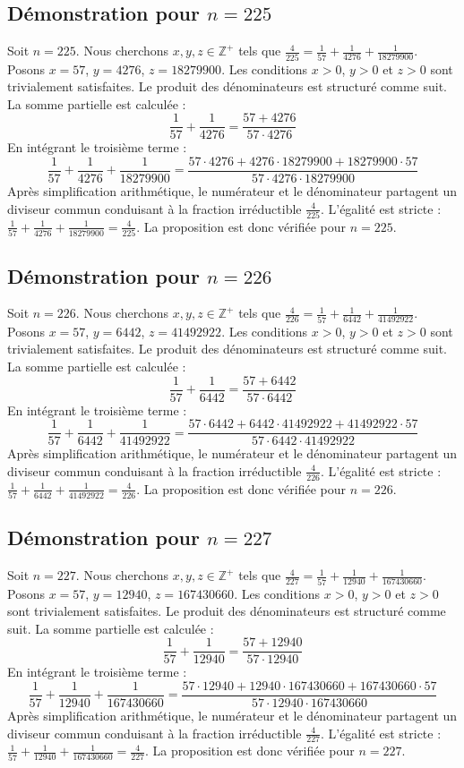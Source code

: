 \documentclass[11pt,a4paper]{article}
\begin{document}
\subsection{Démonstration pour $n = 225$}
Soit $n = 225$. Nous cherchons $x, y, z \in \mathbb{Z}^{+}$ tels que $\frac{4}{225} = \frac{1}{57} + \frac{1}{4276} + \frac{1}{18279900}$.
Posons $x = 57$, $y = 4276$, $z = 18279900$.
Les conditions $x > 0$, $y > 0$ et $z > 0$ sont trivialement satisfaites.
Le produit des dénominateurs est structuré comme suit. La somme partielle est calculée :
$$ \frac{1}{57} + \frac{1}{4276} = \frac{57+4276}{57 \cdot 4276} $$
En intégrant le troisième terme :
$$ \frac{1}{57} + \frac{1}{4276} + \frac{1}{18279900} = \frac{57 \cdot 4276 + 4276 \cdot 18279900 + 18279900 \cdot 57}{57 \cdot 4276 \cdot 18279900} $$
Après simplification arithmétique, le numérateur et le dénominateur partagent un diviseur commun conduisant à la fraction irréductible $\frac{4}{225}$.
L'égalité est stricte : $\frac{1}{57} + \frac{1}{4276} + \frac{1}{18279900} = \frac{4}{225}$.
La proposition est donc vérifiée pour $n = 225$.
\subsection{Démonstration pour $n = 226$}
Soit $n = 226$. Nous cherchons $x, y, z \in \mathbb{Z}^{+}$ tels que $\frac{4}{226} = \frac{1}{57} + \frac{1}{6442} + \frac{1}{41492922}$.
Posons $x = 57$, $y = 6442$, $z = 41492922$.
Les conditions $x > 0$, $y > 0$ et $z > 0$ sont trivialement satisfaites.
Le produit des dénominateurs est structuré comme suit. La somme partielle est calculée :
$$ \frac{1}{57} + \frac{1}{6442} = \frac{57+6442}{57 \cdot 6442} $$
En intégrant le troisième terme :
$$ \frac{1}{57} + \frac{1}{6442} + \frac{1}{41492922} = \frac{57 \cdot 6442 + 6442 \cdot 41492922 + 41492922 \cdot 57}{57 \cdot 6442 \cdot 41492922} $$
Après simplification arithmétique, le numérateur et le dénominateur partagent un diviseur commun conduisant à la fraction irréductible $\frac{4}{226}$.
L'égalité est stricte : $\frac{1}{57} + \frac{1}{6442} + \frac{1}{41492922} = \frac{4}{226}$.
La proposition est donc vérifiée pour $n = 226$.
\subsection{Démonstration pour $n = 227$}
Soit $n = 227$. Nous cherchons $x, y, z \in \mathbb{Z}^{+}$ tels que $\frac{4}{227} = \frac{1}{57} + \frac{1}{12940} + \frac{1}{167430660}$.
Posons $x = 57$, $y = 12940$, $z = 167430660$.
Les conditions $x > 0$, $y > 0$ et $z > 0$ sont trivialement satisfaites.
Le produit des dénominateurs est structuré comme suit. La somme partielle est calculée :
$$ \frac{1}{57} + \frac{1}{12940} = \frac{57+12940}{57 \cdot 12940} $$
En intégrant le troisième terme :
$$ \frac{1}{57} + \frac{1}{12940} + \frac{1}{167430660} = \frac{57 \cdot 12940 + 12940 \cdot 167430660 + 167430660 \cdot 57}{57 \cdot 12940 \cdot 167430660} $$
Après simplification arithmétique, le numérateur et le dénominateur partagent un diviseur commun conduisant à la fraction irréductible $\frac{4}{227}$.
L'égalité est stricte : $\frac{1}{57} + \frac{1}{12940} + \frac{1}{167430660} = \frac{4}{227}$.
La proposition est donc vérifiée pour $n = 227$.
\end{document}
